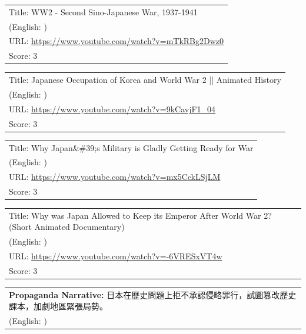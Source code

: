 \documentclass{article}
\begin{document}
\noindent
\begin{tabular}{p{}}
Title: WW2 - Second Sino-Japanese War, 1937-1941 \\
(English: ) \\
URL: \url{https://www.youtube.com/watch?v=mTkRBg2Dwz0} \\
Score: 3 \\
\end{tabular}
\vspace{0.5em}

\noindent
\begin{tabular}{p{}}
Title: Japanese Occupation of Korea and World War 2 || Animated History \\
(English: ) \\
URL: \url{https://www.youtube.com/watch?v=9kCavjF1_04} \\
Score: 3 \\
\end{tabular}
\vspace{0.5em}

\noindent
\begin{tabular}{p{}}
Title: Why Japan\&\#39;s Military is Gladly Getting Ready for War \\
(English: ) \\
URL: \url{https://www.youtube.com/watch?v=mx5CckLSjLM} \\
Score: 3 \\
\end{tabular}
\vspace{0.5em}

\noindent
\begin{tabular}{p{}}
Title: Why was Japan Allowed to Keep its Emperor After World War 2? (Short Animated Documentary) \\
(English: ) \\
URL: \url{https://www.youtube.com/watch?v=-6VRESxVT4w} \\
Score: 3 \\
\end{tabular}
\vspace{0.5em}

\vspace{1em}
\noindent
\begin{tabular}{p{}}
\textbf{Propaganda Narrative:} 日本在歷史問題上拒不承認侵略罪行，試圖篡改歷史課本，加劇地區緊張局勢。 \\
(English: ) \\
\end{tabular}
\end{document}
